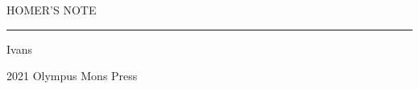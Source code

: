 
\begin{titlepage}
    \centering   %
    \scshape     %
    \vspace*{\baselineskip}   %

	
	
    \vspace{0.75\baselineskip} %

    {\LARGE\heiti HOMER'S NOTE } %
	
	\vspace{0.75\baselineskip} %
	
	\rule{\textwidth}{0.4pt}\vspace*{-\baselineskip}\vspace{3.2pt} %
	
	\vspace{4\baselineskip} %
	
	
    {\fangsong\Large Ivans \\[10pt] } %
	

	\vspace{0.5\baselineskip} %
	
	
	\vfill %
	
	
	
	\vspace{0.3\baselineskip} %
	
	2021 %
	{\large Olympus Mons Press} %
\end{titlepage}

